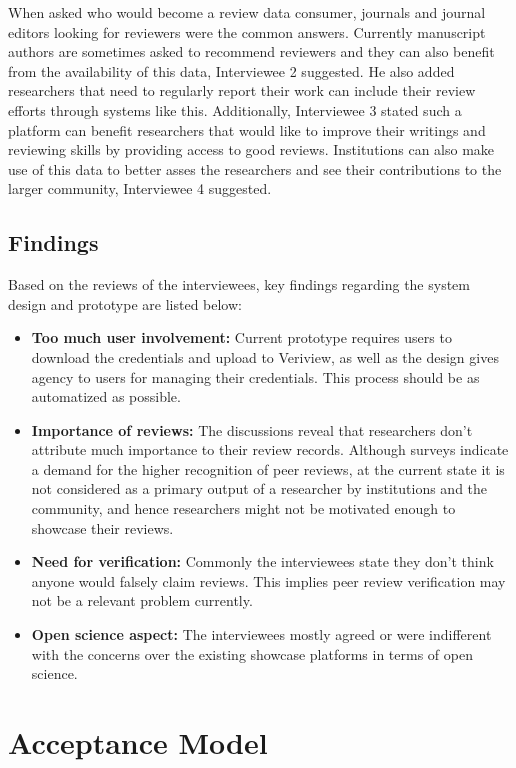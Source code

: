 When asked who would become a review data consumer, journals and journal editors looking for reviewers were the common answers. Currently manuscript authors are sometimes asked to recommend reviewers and they can also benefit from the availability of this data, Interviewee 2 suggested. He also added researchers that need to regularly report their work can include their review efforts through systems like this. Additionally, Interviewee 3 stated such a platform can benefit researchers that would like to improve their writings and reviewing skills by providing access to good reviews. Institutions can also make use of this data to better asses the researchers and see their contributions to the larger community, Interviewee 4 suggested.

\subsection{Findings}

Based on the reviews of the interviewees, key findings regarding the system design and prototype are listed below: 

\begin{itemize}
    \item \textbf{Too much user involvement:} Current prototype requires users to download the credentials and upload to Veriview, as well as the design gives agency to users for managing their credentials. This process should be as automatized as possible.
    \item \textbf{Importance of reviews:} The discussions reveal that researchers don't attribute much importance to their review records. Although surveys indicate a demand for the higher recognition of peer reviews, at the current state it is not considered as a primary output of a researcher by institutions and the community, and hence researchers might not be motivated enough to showcase their reviews.
    \item \textbf{Need for verification:} Commonly the interviewees state they don't think anyone would falsely claim reviews. This implies peer review verification may not be a relevant problem currently. 
    \item \textbf{Open science aspect:} The interviewees mostly agreed or were indifferent with the concerns over the existing showcase platforms in terms of open science. 
\end{itemize}

\section{Acceptance Model}

